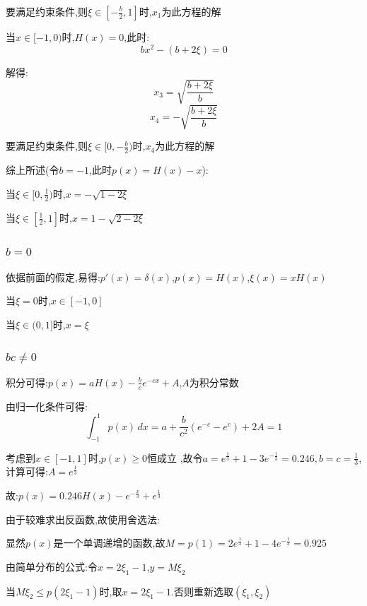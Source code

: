 \documentclass[UTF8]{ctexart}
\begin{document}
要满足约束条件,则$\xi \in [-\frac{b}{2},1]$时,$x_1$为此方程的解

当$x\in [-1,0)$时,$H(x)=0$,此时:
\begin{equation}
    bx^2-(b+2\xi)=0
\end{equation}

解得:
\begin{equation}
    x_3=\sqrt{\frac{b+2\xi}{b}}
\end{equation}
\begin{equation}
    x_4=-\sqrt{\frac{b+2\xi}{b}}
\end{equation}

要满足约束条件,则$\xi \in[0,-\frac{b}{2})$时,$x_4$为此方程的解

综上所述(令$b=-1$,此时$p(x)=H(x)-x$):

当$\xi \in[0,\frac{1}{2})$时,$x=-\sqrt{1-2\xi}$

当$\xi \in [\frac{1}{2},1]$时,$x=1-\sqrt{2-2\xi}$

\subsubsection{$b=0$}
依据前面的假定,易得:$p'(x)=\delta (x)$,\quad $p(x)=H(x)$,\quad $\xi(x)=xH(x)$

当$\xi=0$时,$x\in[-1,0]$

当$\xi\in(0,1]$时,$x=\xi$

\subsubsection{$bc\neq 0$}
积分可得:$p(x)=aH(x)-\frac{b}{c}e^{-cx}+A$,$A$为积分常数

由归一化条件可得:
\begin{equation}
    \int_{-1}^{1} p(x) \,dx =a+\frac{b}{c^2}(e^{-c}-e^c)+2A=1
\end{equation}

考虑到$x\in[-1,1]$时,$p(x)\geq0$恒成立
,故令$a=e^\frac{1}{3}+1-3e^{-\frac{1}{3}}=0.246,b=c=\frac{1}{3}$,计算可得:$A=e^{\frac{1}{3}}$

故:$p(x)=0.246H(x)-e^{-\frac{x}{3}}+e^{\frac{1}{3}}$

由于较难求出反函数,故使用舍选法:

显然$p(x)$是一个单调递增的函数,故$M=p(1)=2e^\frac{1}{3}+1-4e^{-\frac{1}{3}}=0.925$

由简单分布的公式:令$x=2\xi_1-1$,\quad $y=M\xi_2$

当$M\xi_2\leq p(2\xi_1-1)$时,取$x=2\xi_1-1$.否则重新选取$(\xi_1,\xi_2)$
\end{document}
